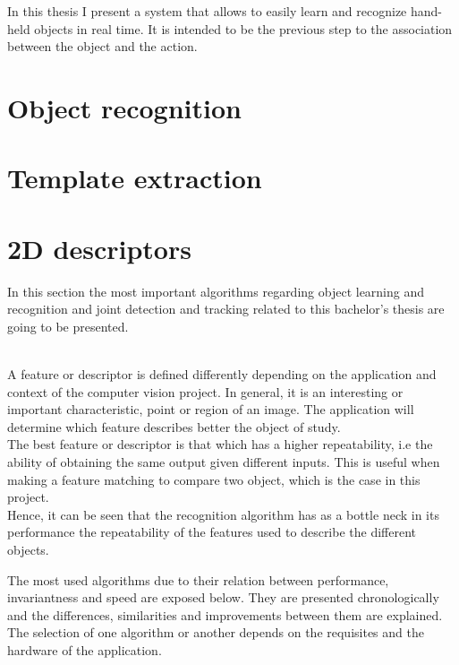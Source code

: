 	In this thesis I present a system that allows to easily learn and recognize hand-held objects in real time. 
	It is intended to be the previous step to the association between the object and the action. 



\section{Object recognition}

\section{Template extraction}

\section{2D descriptors}
\label{features}
In this section the most important algorithms regarding object learning and recognition and joint detection and tracking related to this bachelor's thesis are going to be presented.

\\
A feature or descriptor is defined differently depending on the application and context of the computer vision project. In general, it is an interesting or important characteristic, point or region of an image. The application will determine which feature describes better the object of study. 
\\

The best feature or descriptor is that which has a higher repeatability, i.e the ability of obtaining the same output given different inputs. This is useful when making a feature matching to compare two object, which is the case in this project. 
\\

Hence, it can be seen that the recognition algorithm has as a bottle neck in its performance the repeatability of the features used to describe the different objects. 

The most used algorithms due to their relation between performance, invariantness and speed are exposed below. They are presented chronologically and the differences, similarities and improvements between them are explained. 
\\

The selection of one algorithm or another depends on the requisites and the hardware of the application.
\\

